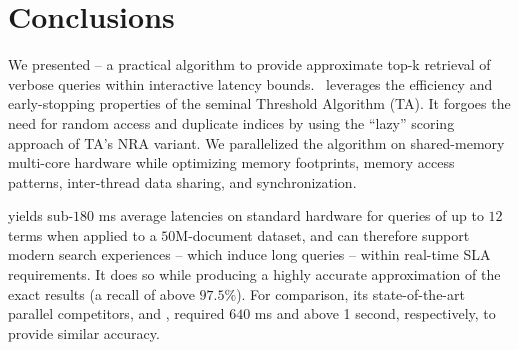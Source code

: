 \section{Conclusions}
\label{sec:conclusions}

We presented \alg\/ -- a practical algorithm to provide 
approximate top-k retrieval of verbose queries within interactive latency bounds.
\alg\ leverages the efficiency and early-stopping properties of the seminal Threshold Algorithm (TA). 
It forgoes the need for random access and duplicate indices by using the ``lazy'' scoring approach of TA's 
NRA variant. We parallelized the algorithm on shared-memory multi-core hardware while 
optimizing memory footprints, memory access 
patterns, inter-thread data sharing, and synchronization.  

\alg\/ yields sub-$180$ ms average latencies on standard hardware for queries of up to $12$ terms when applied 
to a $50$M-document dataset, %
and can therefore support modern search experiences -- which induce long queries --
within real-time SLA requirements.  It does so while producing a highly accurate approximation of the exact results 
(a recall of above $97.5\%$). %
For comparison, its state-of-the-art parallel competitors, \pBMW\/ and \pJASS,  
required $640$ ms and above 1 second, respectively, to provide similar accuracy.

